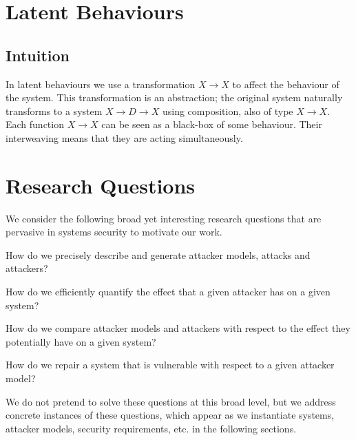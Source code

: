 \section{Latent Behaviours}
\subsection{Intuition}
In latent behaviours we use a transformation $X\rightarrow X$ to affect the behaviour of the system. This transformation is an abstraction; the original system naturally transforms to a system $X\rightarrow D \rightarrow X$ using composition, also of type $X\rightarrow X$. Each function $X\rightarrow X$ can be seen as a black-box of some behaviour. Their interweaving means that they are acting simultaneously. 

\section{Research Questions}
We consider the following broad yet interesting research questions that are pervasive in systems security to motivate our work.
\begin{question}
\label{que:AttackerModel}
How do we precisely describe and generate attacker models, attacks and attackers?
\end{question}
\begin{question}
\label{que:Quantification}
How do we efficiently quantify the effect that a given attacker has on a given system? 
\end{question}
\begin{question}
\label{que:Classification}
How do we compare attacker models and attackers with respect to the effect they potentially have on a given system?
\end{question}
\begin{question}
\label{que:Repair}
How do we repair a system that is vulnerable with respect to a given attacker model?
\end{question}
We do not pretend to solve these questions at this broad level, but we address concrete instances of these questions, which appear as we instantiate systems, attacker models, security requirements, etc. in the following sections.
